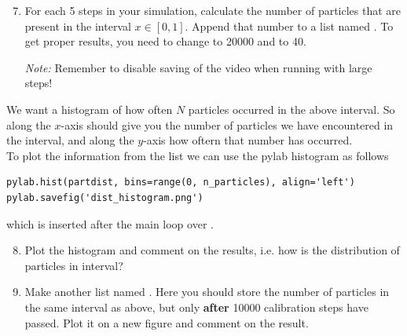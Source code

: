 \documentclass{article}
\begin{document}
\begin{enumerate}
  \setcounter{enumi}{6}
  \item For each 5 steps in your simulation, calculate the number of particles
    that are present in the interval $x \in [0, 1]$.
    Append that number to a list named .  To get proper results,
    you need to change  to 20000 and  to 40.

    {\em Note:} Remember to disable saving of the video when running with large
    steps!

\end{enumerate}

We want a histogram of how often $N$ particles occurred in the above
interval. So along the $x$-axis should give you the number of particles we have
encountered in the interval, and along the $y$-axis how oftern that number
has occurred.\\

To plot the information from the list we can use the pylab histogram as follows

\begin{lstlisting}
pylab.hist(partdist, bins=range(0, n_particles), align='left')
pylab.savefig('dist_histogram.png')
\end{lstlisting}

which is inserted after the main loop over .

\begin{enumerate}
  \setcounter{enumi}{7}
  \item Plot the histogram and comment on the results, i.e. how is the
    distribution of particles in interval?

  \item Make another list named . Here you should store the
    number of particles in the same interval as above, but only {\bf after}
    10000 calibration steps have passed. Plot it on a new figure and comment
    on the result.

\end{enumerate}
\end{document}
